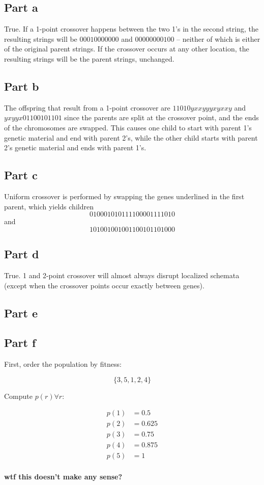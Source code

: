 \documentclass[a4paper]{article}
\begin{document}
\subsection{Part a}
True. If a 1-point crossover happens between the two 1's in the second string,
the resulting strings will be $00010000000$ and $00000000100$ -- neither of
which is either of the original parent strings. If the crossover occurs at any
other location, the resulting strings will be the parent strings, unchanged.

\subsection{Part b}
The offspring that result from a 1-point crossover are $11010yxxyyyxyxxy$ and
$yxyyx01100101101$ since the parents are split at the crossover point, and the
ends of the chromosomes are swapped.  This causes one child to start with
parent 1's genetic material and end with parent 2's, while the other child
starts with parent 2's genetic material and ends with parent 1's.

\subsection{Part c}
Uniform crossover is performed by swapping the genes underlined in the first
parent, which yields children $$01000101 01111000 01111010$$ and $$10100100
10011001 01101000$$

\subsection{Part d}
True. 1 and 2-point crossover will almost always disrupt localized schemata
(except when the crossover points occur exactly between genes).

\subsection{Part e}

\subsection{Part f}
First, order the population by fitness:

$$\{3, 5, 1, 2, 4\}$$

Compute $p(r) \forall r$:

\begin{align*}
    p(1) &= 0.5 \\
    p(2) &= 0.625 \\
    p(3) &= 0.75 \\
    p(4) &= 0.875 \\
    p(5) &= 1 \\
\end{align*}

\textbf{wtf this doesn't make any sense?}
\end{document}

